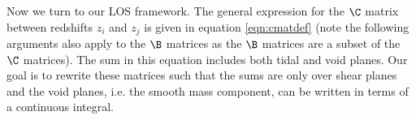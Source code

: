 Now we turn to our LOS framework. The general expression for the $\C$ matrix between redshifts $z_i$ and $z_j$ is given in equation \ref{eqn:cmatdef} (note the following arguments also apply to the $\B$ matrices as the $\B$ matrices are a subset of the $\C$ matrices). The sum in this equation includes both tidal and void planes. Our goal is to rewrite these matrices such that the sums are only over shear planes and the void planes, i.e. the smooth mass component, can be written in terms of a continuous integral. 
